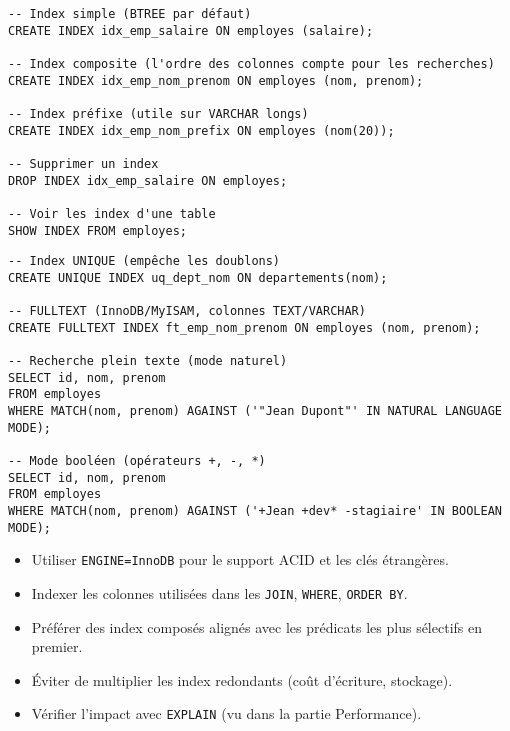 \documentclass[a4paper,11pt]{article}
\begin{document}
\begin{tcolorbox}[colback=teal!5!white,colframe=teal!60!black,title=Index: créer/ supprimer /lister]
\begin{verbatim}
-- Index simple (BTREE par défaut)
CREATE INDEX idx_emp_salaire ON employes (salaire);

-- Index composite (l'ordre des colonnes compte pour les recherches)
CREATE INDEX idx_emp_nom_prenom ON employes (nom, prenom);

-- Index préfixe (utile sur VARCHAR longs)
CREATE INDEX idx_emp_nom_prefix ON employes (nom(20));

-- Supprimer un index
DROP INDEX idx_emp_salaire ON employes;

-- Voir les index d'une table
SHOW INDEX FROM employes;
\end{verbatim}
\end{tcolorbox}

\begin{tcolorbox}[colback=purple!5!white,colframe=purple!70!black,title=Index spécialisés: FULLTEXT et UNIQUE]
\begin{verbatim}
-- Index UNIQUE (empêche les doublons)
CREATE UNIQUE INDEX uq_dept_nom ON departements(nom);

-- FULLTEXT (InnoDB/MyISAM, colonnes TEXT/VARCHAR)
CREATE FULLTEXT INDEX ft_emp_nom_prenom ON employes (nom, prenom);

-- Recherche plein texte (mode naturel)
SELECT id, nom, prenom
FROM employes
WHERE MATCH(nom, prenom) AGAINST ('"Jean Dupont"' IN NATURAL LANGUAGE MODE);

-- Mode booléen (opérateurs +, -, *)
SELECT id, nom, prenom
FROM employes
WHERE MATCH(nom, prenom) AGAINST ('+Jean +dev* -stagiaire' IN BOOLEAN MODE);
\end{verbatim}
\end{tcolorbox}

\begin{tcolorbox}[colback=red!5!white,colframe=red!75!black,title=Bonnes pratiques express]
\begin{itemize}
  \item Utiliser \texttt{ENGINE=InnoDB} pour le support ACID et les clés étrangères.
  \item Indexer les colonnes utilisées dans les \texttt{JOIN}, \texttt{WHERE}, \texttt{ORDER BY}.
  \item Préférer des index composés alignés avec les prédicats les plus sélectifs en premier.
  \item Éviter de multiplier les index redondants (coût d’écriture, stockage).
  \item Vérifier l’impact avec \texttt{EXPLAIN} (vu dans la partie Performance).
\end{itemize}
\end{tcolorbox}
\end{document}
